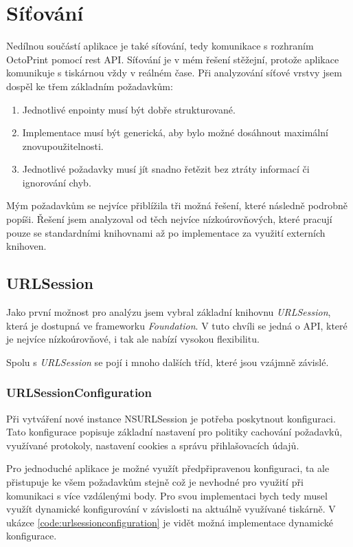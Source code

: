 \section{Síťování}\label{analyza-sitovani}

Nedílnou součástí aplikace je také síťování, tedy komunikace s rozhraním OctoPrint pomocí \acrshort{rest} API.
Síťování je v mém řešení stěžejní, protože aplikace komunikuje s tiskárnou vždy v reálném čase.
Při analyzování síťové vrstvy jsem dospěl ke třem základním požadavkům:

\begin{enumerate}
    \item Jednotlivé enpointy musí být dobře strukturované.
    \item Implementace musí být generická, aby bylo možné dosáhnout maximální znovupoužitelnosti.
    \item Jednotlivé požadavky musí jít snadno řetězit bez ztráty informací či ignorování chyb.
\end{enumerate}

Mým požadavkům se nejvíce přiblížila tři možná řešení, které následně podrobně popíši.
Řešení jsem analyzoval od těch nejvíce nízkoúrovňových, které pracují pouze se standardními knihovnami až po implementace za využití externích knihoven.

\subsection{URLSession}

Jako první možnost pro analýzu jsem vybral základní knihovnu \textit{URLSession}, která je dostupná ve frameworku \textit{Foundation}.
V tuto chvíli se jedná o API, které je nejvíce nízkoúrovňové, i tak ale nabízí vysokou flexibilitu.

Spolu s \textit{URLSession} se pojí i mnoho dalších tříd, které jsou vzájmně závislé.

\subsubsection*{URLSessionConfiguration}

Při vytváření nové instance NSURLSession je potřeba poskytnout konfiguraci.
Tato konfigurace popisuje základní nastavení pro politiky cachování požadavků, využívané protokoly, nastavení cookies a správu přihlašovacích údajů.

Pro jednoduché aplikace je možné využít předpřipravenou konfiguraci, ta ale přistupuje ke všem požadavkům stejně což je nevhodné pro využití při komunikaci s více vzdálenými body.
Pro svou implementaci bych tedy musel využít dynamické konfigurování v závislosti na aktuálně využívané tiskárně.
V ukázce \ref{code:urlsessionconfiguration} je vidět možná implementace dynamické konfigurace.

